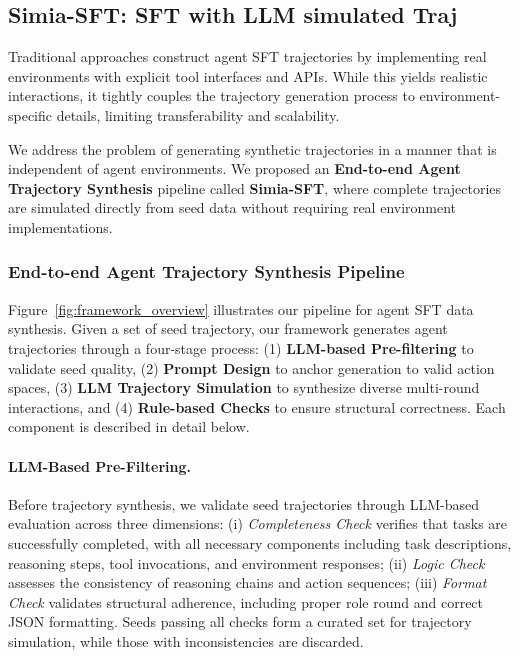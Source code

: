 \subsection{Simia-SFT: SFT with LLM simulated Traj}
\label{sec:SFT_methodology}

Traditional approaches construct agent SFT trajectories by implementing real environments with explicit tool interfaces and APIs. While this yields realistic interactions, it tightly couples the trajectory generation process to environment-specific details, limiting transferability and scalability. 

We address the problem of generating synthetic trajectories in a manner that is independent of agent environments. We proposed an \textbf{End-to-end Agent Trajectory Synthesis} pipeline called \textbf{Simia-SFT}, where complete trajectories are simulated directly from seed data without requiring real environment implementations. 






\subsubsection{End-to-end Agent Trajectory Synthesis Pipeline}

Figure~\ref{fig:framework_overview} illustrates our pipeline for agent SFT data synthesis. Given a set of seed trajectory, our framework generates agent trajectories through a four-stage process: (1) \textbf{LLM-based Pre-filtering} to validate seed quality, (2) \textbf{Prompt Design} to anchor generation to valid action spaces, (3) \textbf{LLM Trajectory Simulation} to synthesize diverse multi-round interactions, and (4) \textbf{Rule-based Checks} to ensure structural correctness. Each component is described in detail below.

\paragraph{LLM-Based Pre-Filtering.}
Before trajectory synthesis, we validate seed trajectories through LLM-based evaluation across three dimensions: (i) \textit{Completeness Check} verifies that tasks are successfully completed, with all necessary components including task descriptions, reasoning steps, tool invocations, and environment responses; (ii) \textit{Logic Check} assesses the consistency of reasoning chains and action sequences; (iii) \textit{Format Check} validates structural adherence, including proper role round and correct JSON formatting. Seeds passing all checks form a curated set for trajectory simulation, while those with inconsistencies are discarded.

